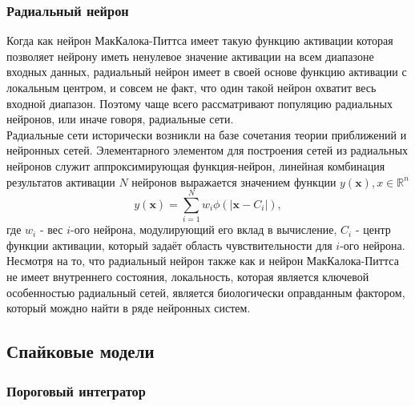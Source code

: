 \documentclass[a4paper,10pt]{article}
\begin{document}
\subsubsection{Радиальный нейрон}
\indent Когда как нейрон МакКалока-Питтса имеет такую функцию активации которая позволяет нейрону иметь ненулевое значение активации на всем  диапазоне входных данных, радиальный нейрон имеет в своей основе функцию активации с локальным центром, и совсем не факт, что один такой нейрон охватит весь входной диапазон. Поэтому чаще всего рассматривают популяцию радиальных нейронов, или иначе говоря, радиальные сети.\\ 
\indent Радиальные сети исторически возникли на базе сочетания теории приближений и нейронных сетей. Элементарного элементом для построения сетей из радиальных нейронов служит аппроксимирующая функция-нейрон, линейная комбинация результатов активации $N$ нейронов выражается значением функции $y(\boldsymbol{x}), x\in \mathbb{R}^n$
   \begin{equation*}\label{eq:rbf}
   y(\boldsymbol{x}) = \sum_{i=1}^{N}w_{i}\phi(|\boldsymbol{x}-C_{i}|),
   \end{equation*}
где $w_{i}$ - вес $i$-ого нейрона, модулирующий его вклад в вычисление, $C_{i}$ - центр функции активации, который задаёт область чувствительности для $i$-ого нейрона.\\
\indent Несмотря на то, что радиальный нейрон также как и нейрон МакКалока-Питтса не имеет внутреннего состояния, локальность, которая является ключевой особенностью радиальный сетей, является биологически оправданным фактором, который мождно найти в ряде нейронных систем.\\

\subsection{Спайковые модели}   
\subsubsection{Пороговый интегратор}
\end{document}
